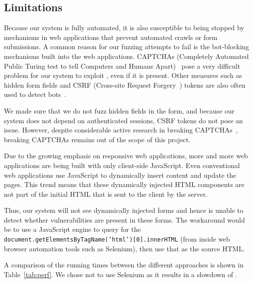 \subsection[Limitations]{Limitations}
\label{limitations}
		Because our system is fully automated, it is also susceptible to being stopped by mechanisms in web applications that prevent automated crawls or form submissions. A common reason for our fuzzing attempts to fail is the bot-blocking mechanisms built into the web applications. CAPTCHAs (Completely Automated Public Turing test to tell Computers and Humans Apart)~\cite{captchas2} pose a very difficult problem for our system to exploit \ehi, even if it is present.
		Other measures such as hidden form fields and CSRF (Cross-site Request Forgery~\cite{csrf}) tokens are also often used to detect bots~\cite{captchas3, captchas2}.

		We made sure that we do not fuzz hidden fields in the form, and because our system does not depend on authenticated sessions, CSRF tokens do not pose an issue. However, despite considerable active research in breaking CAPTCHAs~\cite{captchas2, captchas}, breaking CAPTCHAs remains out of the scope of this project. 
		
	   Due to the growing emphasis on responsive web applications, more and more web applications are being built with only client-side JavaScript. Even conventional web applications use JavaScript to dynamically insert content and update the pages. This trend means that these dynamically injected HTML components are not part of the initial HTML that is sent to the client by the server.

		Thus, our system will not see dynamically injected forms and hence is unable to detect whether \ehi vulnerabilities are present in these forms. The workaround would be to use a JavaScript engine to query for the \texttt{document.getElementsByTagName('html')[0].innerHTML} (from inside web browser automation tools such as Selenium), then use that as the source HTML. 
		
		A comparison of the running times between the different approaches is shown in Table~\ref{tab:perf}. We chose not to use Selenium as it results in a slowdown of \slowSelenium. 
		
